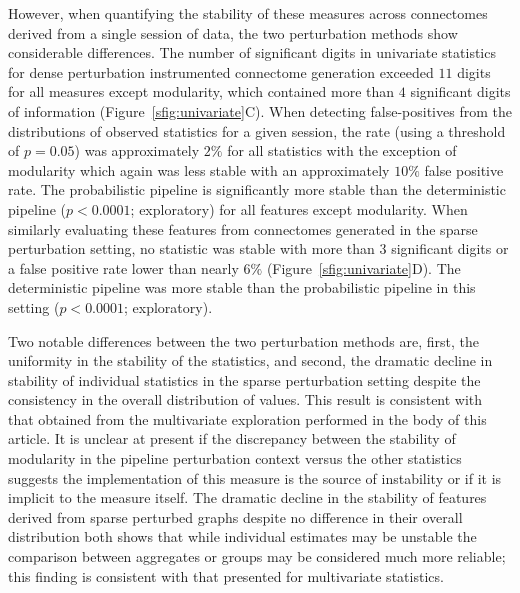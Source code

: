 \documentclass[fleqn,10pt]{SelfArx} %
\newcommand{\new}[1]{{\color{blue} #1}}
\begin{document}
However, when quantifying the stability of these measures across connectomes derived from a single session of data, the
two perturbation methods show considerable differences. The number of significant digits in univariate statistics for
\new{dense} perturbation instrumented connectome generation exceeded $11$ digits for all measures except modularity, which
contained more than $4$ significant digits of information (Figure~\ref{sfig:univariate}C). When detecting \new{false-positives}
from the distributions of observed statistics for a given session, the rate (using a threshold of $p = 0.05$)
was approximately $2\%$ for all statistics with the exception of modularity which again was less stable with an
approximately $10\%$ false positive rate. The probabilistic pipeline is significantly more stable than the
deterministic pipeline ($p < 0.0001$; exploratory) for all features except modularity. When similarly evaluating these
features from connectomes generated in the \new{sparse} perturbation setting, no statistic was stable with more than $3$
significant digits or a false positive rate lower than nearly $6\%$ (Figure~\ref{sfig:univariate}D). The deterministic
pipeline was more stable than the probabilistic pipeline in this setting ($p < 0.0001$; exploratory).

Two notable differences between the two perturbation methods are, first, the uniformity in the stability of the
statistics, and second, the dramatic decline in stability of individual statistics in the \new{sparse} perturbation setting
despite the consistency in the overall distribution of values. \new{This result is consistent with that obtained
from the multivariate exploration performed in the body of this article.} It is unclear at present if the discrepancy
between the stability of modularity in the pipeline perturbation context versus the other statistics suggests the
implementation of this measure is the source of instability or if it is implicit to the measure itself. The dramatic
decline in the stability of features derived from \new{sparse} perturbed graphs despite no difference in their overall
distribution both shows that while individual estimates may be unstable the comparison between aggregates or groups may
be considered much more reliable; this finding is consistent with that presented for multivariate statistics.
\end{document}
